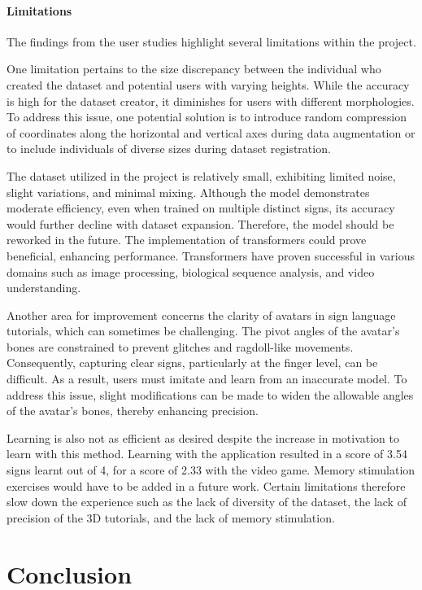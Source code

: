 \paragraph[]{Limitations}

The findings from the user studies highlight several limitations within the project.

One limitation pertains to the size discrepancy between the individual who created the dataset and potential users with varying heights. While the accuracy is high for the dataset creator, it diminishes for users with different morphologies. To address this issue, one potential solution is to introduce random compression of coordinates along the horizontal and vertical axes during data augmentation or to include individuals of diverse sizes during dataset registration.

The dataset utilized in the project is relatively small, exhibiting limited noise, slight variations, and minimal mixing. Although the model demonstrates moderate efficiency, even when trained on multiple distinct signs, its accuracy would further decline with dataset expansion. Therefore, the model should be reworked in the future. The implementation of transformers could prove beneficial, enhancing performance. Transformers have proven successful in various domains such as image processing, biological sequence analysis, and video understanding.

Another area for improvement concerns the clarity of avatars in sign language tutorials, which can sometimes be challenging. The pivot angles of the avatar's bones are constrained to prevent glitches and ragdoll-like movements. Consequently, capturing clear signs, particularly at the finger level, can be difficult. As a result, users must imitate and learn from an inaccurate model. To address this issue, slight modifications can be made to widen the allowable angles of the avatar's bones, thereby enhancing precision.

Learning is also not as efficient as desired despite the increase in motivation to learn with this method. Learning with the application resulted in a score of 3.54 signs learnt out of 4, for a score of 2.33 with the video game. Memory stimulation exercises would have to be added in a future work. Certain limitations therefore slow down the experience such as the lack of diversity of the dataset, the lack of precision of the 3D tutorials, and the lack of memory stimulation.

\section{Conclusion}

